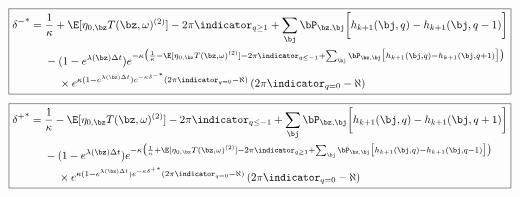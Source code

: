 \documentclass[12pt]{article}
\begin{document}
\begin{equation}
\label{eq:discretedeltaminusfeedback}
\boxed{
\begin{split}
{\delta^-}^* & = \frac{1}{\kappa} + \E[\eta_{0,\bz} T(\bz, \omega)^{(2)}] - 2 \pi \indicator_{q \geq 1} + \sum_\bj \bP_{\bz,\bj} \biggl[ h_{k+1}(\bj, q) - h_{k+1}(\bj, q-1) \biggr] \\
& \hphantom{{}={}} - (1-e^{\lambda (\bz) \Delta t})e^{-\kappa \bigl( \frac{1}{\kappa} - \E[\eta_{0,\bz} T(\bz, \omega)^{(2)}] - 2 \pi \indicator_{q \leq -1} + \sum_\bj \bP_{\bz,\bj} \bigl[ h_{k+1}(\bj, q) - h_{k+1}(\bj, q+1) \bigr] \bigr) } \\
& \hphantom{{}={} {}-{}} \times e^{\kappa (1-e^{\lambda (\bz) \Delta t})e^{-\kappa {\delta^-}^*} \left( 2 \pi \indicator_{q = 0} - \aleph \right)} \left( 2 \pi \indicator_{q = 0} - \aleph \right)
\end{split}
}
\end{equation}
\begin{equation}
\label{eq:discretedeltaplusfeedback}
\boxed{
\begin{split}
{\delta^+}^* & = \frac{1}{\kappa} - \E[\eta_{0,\bz} T(\bz, \omega)^{(2)}] - 2 \pi \indicator_{q \leq -1} + \sum_\bj \bP_{\bz,\bj} \biggl[ h_{k+1}(\bj, q) - h_{k+1}(\bj, q+1) \biggr] \\
& \hphantom{{}={}} - (1-e^{\lambda (\bz) \Delta t})e^{-\kappa \bigl( \frac{1}{\kappa} + \E[\eta_{0,\bz} T(\bz, \omega)^{(2)}] - 2 \pi \indicator_{q \geq 1} + \sum_\bj \bP_{\bz,\bj} \bigl[ h_{k+1}(\bj, q) - h_{k+1}(\bj, q-1) \bigr] \bigr) } \\
& \hphantom{{}={} {}-{}} \times e^{\kappa (1-e^{\lambda (\bz) \Delta t})e^{-\kappa {\delta^+}^*} \left( 2 \pi \indicator_{q = 0} - \aleph \right)} \left( 2 \pi \indicator_{q = 0} - \aleph \right)
\end{split}
}
\end{equation}
\end{document}
